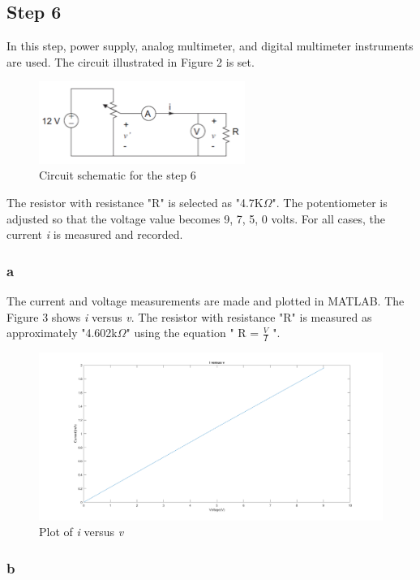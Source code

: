 \documentclass[letterpaper,12pt]{article}
\begin{document}
\subsection{Step 6}
In this step, power supply, analog multimeter, and digital multimeter instruments are used. The circuit illustrated in Figure 2 is set. 
\begin{figure}[H]
	\caption{Circuit schematic for the step 6}
	\centering
	\includegraphics[width=0.6\textwidth]{6.png}
\end{figure} 

The resistor with resistance "R" is selected as "4.7K\(\Omega\)". The potentiometer is adjusted so that the voltage value becomes 9, 7, 5, 0 volts. For all cases, the current \emph{i} is measured and recorded.

\subsubsection{a}
The current and voltage measurements are made and plotted in MATLAB. The Figure 3 shows  \emph{i} versus \emph{v}. The resistor with resistance "R" is measured as approximately "4.602k\(\Omega\)" using the equation " R  = \(\frac{V}{I}\) ".

\begin{figure}[H]
	\caption{Plot of \emph{i} versus \emph{v}}
	\centering
	\includegraphics[width=1\textwidth]{6a.png}
\end{figure} 


\subsubsection{b}
\end{document}
